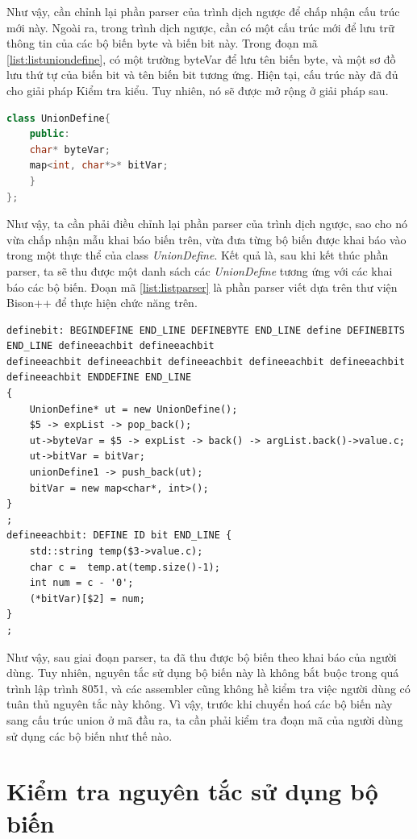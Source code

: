 Như vậy, cần chỉnh lại phần parser của trình dịch ngược để chấp nhận cấu trúc mới này. Ngoài ra, trong trình dịch ngược, cần có một cấu trúc mới để lưu trữ thông tin của các bộ biến byte và biến bit này. Trong đoạn mã \ref{list:listuniondefine}, có một trường byteVar để lưu tên biến byte, và một sơ đồ lưu thứ tự của biến bit và tên biến bit tương ứng. Hiện tại, cấu trúc này đã đủ cho giải pháp Kiểm tra kiểu. Tuy nhiên, nó sẽ được mở rộng ở giải pháp sau. 
\begin{lstlisting}[caption={Cấu trúc dữ liệu để lưu trữ một bộ biến},label={list:listuniondefine},language=c++]
class UnionDefine{
	public:
	char* byteVar;
	map<int, char*>* bitVar;
	}
};
\end{lstlisting}
Như vậy, ta cần phải điều chỉnh lại phần parser của trình dịch ngược, sao cho nó vừa chấp nhận mẫu khai báo biến trên, vừa đưa từng bộ biến được khai báo vào trong một thực thể của class \textit{UnionDefine}. Kết quả là, sau khi kết thúc phần parser, ta sẽ thu được một danh sách các \textit{UnionDefine} tương ứng với các khai báo các bộ biến. Đoạn mã \ref{list:listparser} là phần parser viết dựa trên thư viện Bison++ để thực hiện chức năng trên.\\
\begin{lstlisting}[caption={Đoạn mã parser cho phần khai báo bộ biến},label={list:listparser}]
definebit: BEGINDEFINE END_LINE DEFINEBYTE END_LINE define DEFINEBITS END_LINE defineeachbit defineeachbit
defineeachbit defineeachbit defineeachbit defineeachbit defineeachbit defineeachbit ENDDEFINE END_LINE
{
	UnionDefine* ut = new UnionDefine();
	$5 -> expList -> pop_back();
	ut->byteVar = $5 -> expList -> back() -> argList.back()->value.c;
	ut->bitVar = bitVar;
	unionDefine1 -> push_back(ut);
	bitVar = new map<char*, int>();
}
;
defineeachbit: DEFINE ID bit END_LINE {
	std::string temp($3->value.c);
	char c =  temp.at(temp.size()-1);
	int num = c - '0';
	(*bitVar)[$2] = num;
}
;
\end{lstlisting}
Như vậy, sau giai đoạn parser, ta đã thu được bộ biến theo khai báo của người dùng. Tuy nhiên, nguyên tắc sử dụng bộ biến này là không bắt buộc trong quá trình lập trình 8051, và các assembler cũng không hề kiểm tra việc người dùng có tuân thủ nguyên tắc này không. Vì vậy, trước khi chuyển hoá các bộ biến này sang cấu trúc union ở mã đầu ra, ta cần phải kiểm tra đoạn mã của người dùng sử dụng các bộ biến như thế nào.

\section{Kiểm tra nguyên tắc sử dụng bộ biến}
